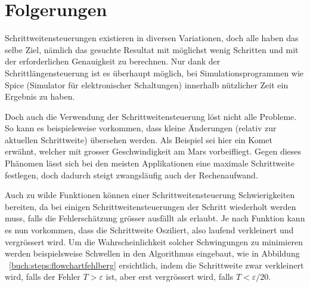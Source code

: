 %
%
%
\section{Folgerungen
\label{steps:section:folgerungen}}
Schrittweitensteuerungen existieren in diversen Variationen, doch alle haben das selbe Ziel, nämlich
das gesuchte Resultat mit möglichst wenig Schritten und mit der erforderlichen Genauigkeit zu berechnen.
Nur dank der Schrittlängensteuerung ist es überhaupt möglich, bei Simulationsprogrammen wie Spice (Simulator für elektronischer Schaltungen)
innerhalb nützlicher Zeit ein Ergebnis zu haben.

Doch auch die Verwendung der Schrittweitensteuerung löst nicht alle Probleme.
So kann es beispielsweise vorkommen, dass kleine Änderungen (relativ zur aktuellen Schrittweite) übersehen werden.
Als Beispiel sei hier ein Komet erwähnt, welcher mit grosser Geschwindigkeit am Mars vorbeifliegt.
Gegen dieses Phänomen lässt sich bei den meisten Applikationen eine maximale Schrittweite festlegen,
doch dadurch steigt zwangsläufig auch der Rechenaufwand.

Auch zu wilde Funktionen können einer Schrittweitensteuerung Schwierigkeiten bereiten,
da bei einigen Schrittweitensteuerungen der Schritt wiederholt werden muss,
falls die Fehlerschätzung grösser ausfällt als erlaubt. Je nach Funktion kann es nun vorkommen,
dass die Schrittweite Osziliert, also laufend verkleinert und vergrössert wird.
Um die Wahrscheinlichkeit solcher Schwingungen zu minimieren werden beispielsweise Schwellen in den Algorithmus eingebaut,
wie in Abbildung ~\ref{buch:steps:flowchartfehlberg} ersichtlich, indem die Schrittweite zwar verkleinert wird,
falls der Fehler $T > \varepsilon$ ist, aber erst vergrössert wird, falls $T < \varepsilon / 20$.

%
